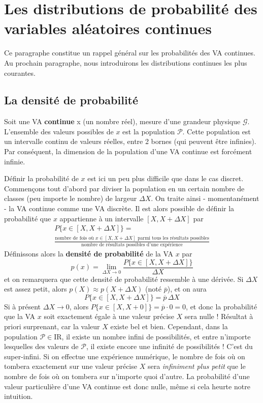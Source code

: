 \section{Les distributions de probabilité des variables aléatoires continues}

Ce paragraphe constitue un rappel général sur les probabilités des VA continues. Au prochain paragraphe, nous introduirons les distributions continues les plus courantes.

\subsection{La densité de probabilité}

Soit une VA \textbf{continue} x (un nombre réel), mesure d'une grandeur physique $\mathcal{G}$. L'ensemble des valeurs possibles de $x$ est la population $\mathcal{P}$. Cette population est un intervalle continu de valeurs réelles, entre 2 bornes (qui peuvent être infinies). Par conséquent, la dimension de la population d'une VA continue est forcément infinie.

Définir la probabilité de $x$ est ici un peu plus difficile que dans le cas discret. Commençons tout d'abord par diviser la population en un certain nombre de classes (peu importe le nombre) de largeur $\Delta X$. On traite ainsi - momentanément - la VA continue comme une VA discrète. Il est alors possible de définir la probabilité que $x$ appartienne à un intervalle $[X,X+\Delta X]$ par
\begin{multline}
    P\{x\in[X,X+\Delta X]\}=\\
    \frac{\text{nombre de fois où $x\in[X,X+\Delta X]$ parmi tous les résultats possibles}}{\text{nombre de résultats possibles d'une expérience}}
    \label{eq:ddlppuvac}
\end{multline}
Définissons alors la \textbf{densité de probabilité} de la VA $x$ par
\begin{equation}
    p(x)=\lim_{\Delta X\rightarrow 0}\frac{P\{x\in[X,X+\Delta X]\}}{\Delta X}
\end{equation}
et on remarquera que cette densité de probabilité ressemble à une dérivée. Si $\Delta X$ est assez petit, alors $p(X)\approx p(X\!+\!\Delta X)$ (noté $\overline{p}$), et on aura
\begin{equation*}
    P\{x\in[X,X+\Delta X]\}=\overline{p}\,\Delta X
\end{equation*}
Si à présent $\Delta X\rightarrow0$, alors $P\{x\in[X,X+0]\}=\overline{p}\cdot 0=0$, et donc la probabilité que la VA $x$ soit exactement égale à une valeur précise $X$ sera nulle ! Résultat à priori surprenant, car la valeur $X$ existe bel et bien. Cependant, dans la population $\mathcal{P}\in\text{I}\!\text{R}$, il existe un nombre infini de possibilités, et entre n'importe lesquelles des valeurs de $\mathcal{P}$, il existe encore une infinité de possibilités ! C'est du super-infini. Si on effectue une expérience numérique, le nombre de fois où on tombera exactement sur une valeur précise $X$ sera \textit{infiniment plus petit} que le nombre de fois où on tombera sur n'importe quoi d'autre. La probabilité d'une valeur particulière d'une VA continue est donc nulle, même si cela heurte notre intuition.

